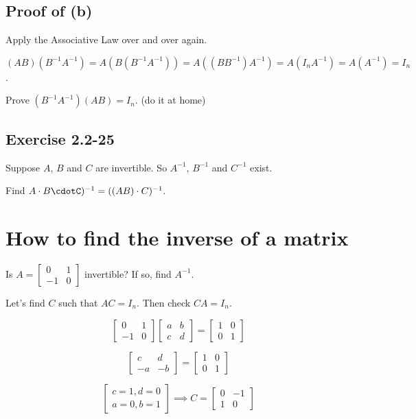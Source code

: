 \documentclass[12pt]{article}
\begin{document}
\subsection{Proof of (b)}

Apply the Associative Law over and over again.

$(AB)(B^{-1}A^{-1}) = A(B(B^{-1}A^{-1})) = A((BB^{-1})A^{-1}) = A(I_nA^{-1}) 
= A(A^{-1}) = I_n$.

Prove $(B^{-1}A^{-1}) (AB) = I_n$. (do it at home)

\subsection{Exercise 2.2-25}

Suppose $A$, $B$ and $C$ are invertible. So $A^{-1}$, $B^{-1}$ and $C^{-1}$ exist.

Find $A\cdot B\cdotC)^{-1} = ((AB)\cdot C)^{-1}$.

\section{How to find the inverse of a matrix}

Is $A = \begin{bmatrix} 0 & 1 \\ -1 & 0 \end{bmatrix}$ invertible? If so, find
$A^{-1}$.

Let's find $C$ such that $AC=I_n$. Then check $CA=I_n$.

\[
  \begin{bmatrix}
    0 & 1 \\
    -1 & 0
  \end{bmatrix}
  \begin{bmatrix}
    a & b \\
    c & d
  \end{bmatrix}
  =
  \begin{bmatrix}
    1 & 0 \\
    0 & 1
  \end{bmatrix}
\]

\[
  \begin{bmatrix}
    c & d \\
    -a & -b
  \end{bmatrix}
  =
  \begin{bmatrix}
    1 & 0 \\
    0 & 1
  \end{bmatrix}
\]

\[
  \begin{bmatrix}
    c = 1, d = 0 \\
    a = 0, b = 1
  \end{bmatrix}
  \implies
  C =
  \begin{bmatrix}
    0 & -1 \\
    1 & 0
  \end{bmatrix}
\]
\end{document}
